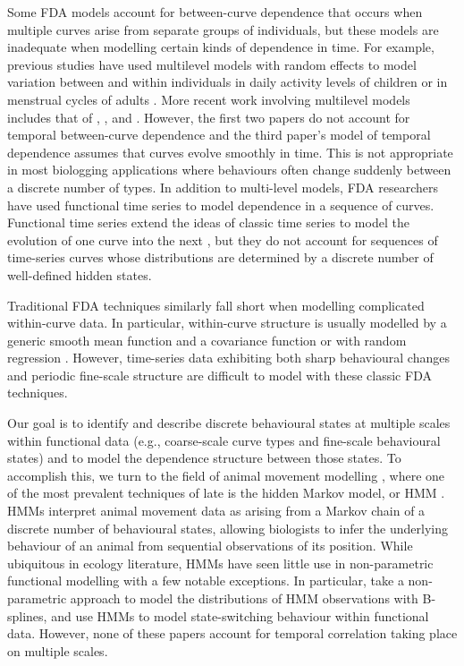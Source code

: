 Some FDA models account for between-curve dependence that occurs when multiple curves arise from separate groups of individuals, but these models are inadequate when modelling certain kinds of dependence in time. For example, previous studies have used multilevel models with random effects to model variation between and within individuals in daily activity levels of children \citep{Morris:2007} or in menstrual cycles of adults \citep{Bromback:1998}. More recent work involving multilevel models includes that of \citet{Di:2009}, \citet{Crainiceanu:2009}, and \citet{Chen:2012}. %
However, the first two papers do not account for temporal between-curve dependence and the third paper's model of temporal dependence assumes that curves evolve smoothly in time. This is not appropriate in most biologging applications where behaviours often change suddenly between a discrete number of types.
In addition to multi-level models, FDA researchers have used functional time series to model dependence in a sequence of curves. Functional time series extend the ideas of classic time series to model the evolution of one curve into the next \citep{Kokoszka:2018}, but they do not account for sequences of time-series curves whose distributions are determined by a discrete number of well-defined hidden states.

Traditional FDA techniques similarly fall short when modelling complicated within-curve data. In particular, within-curve structure is usually modelled by a generic smooth mean function and a covariance function \citep{Yao:2005} or with random regression \citep{Rice:2001}. However, time-series data exhibiting both sharp behavioural changes and periodic fine-scale structure are difficult to model with these classic FDA techniques.

Our goal is to identify and describe discrete behavioural states at multiple scales within functional data (e.g., coarse-scale curve types and fine-scale behavioural states) and to model the dependence structure between those states. To accomplish this, we turn to the field of animal movement modelling \citep{Hooten:2017}, where one of the most prevalent techniques of late is the hidden Markov model, or HMM \citep{Patterson:2017,McClintock:2020}. HMMs interpret animal movement data as arising from a Markov chain of a discrete number of behavioural states, allowing biologists to infer the underlying behaviour of an animal from sequential observations of its position. While ubiquitous in ecology literature, HMMs have seen little use in non-parametric functional modelling with a few notable exceptions. In particular, \citet{Langrock:2018} take a non-parametric approach to model the distributions of HMM observations with B-splines, and \citet{DeSouza:2014,DeSouza:2017} use HMMs to model state-switching behaviour within functional data. However, none of these papers account for temporal correlation taking place on multiple scales. 

